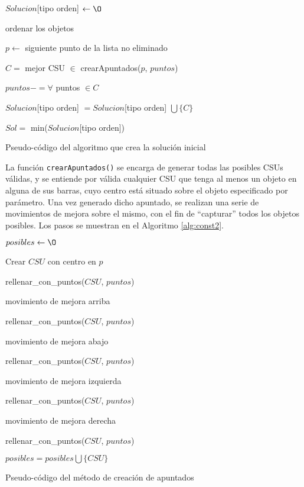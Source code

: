 \begin{algorithm}[H]
$Solucion$[tipo orden] $\leftarrow \O$

 {

  ordenar los objetos

   {

    	$p \leftarrow$ siguiente punto de la lista no eliminado

			$C =$ mejor CSU $\in$ crearApuntados($p$, $puntos$)

			$puntos -= \forall$ puntos $\in C$

			$Solucion$[tipo orden] $ = Solucion$[tipo orden] $ \bigcup\{C\}$
			
	}

}

$Sol =$ min($Solucion$[tipo orden])
\caption{Pseudo-código del algoritmo que crea la solución inicial}
\label{alg:const1}
\end{algorithm}

La función \texttt{crearApuntados()} se encarga de generar todas las posibles
CSUs válidas, y se entiende por válida cualquier CSU que tenga al menos un
objeto en alguna de sus barras, cuyo centro está situado sobre el objeto
especificado por parámetro. Una vez generado dicho apuntado, se realizan una
serie de movimientos de mejora sobre el mismo, con el fin de ``capturar'' todos
los objetos posibles. 
Los pasos se muestran en el Algoritmo \ref{alg:const2}. 

\begin{algorithm}[H]
$posibles \leftarrow \O$

 {

    Crear $CSU$ con centro en $p$ 

    rellenar\_con\_puntos($CSU$, $puntos$)

     {

        movimiento de mejora arriba

        rellenar\_con\_puntos($CSU$, $puntos$)

        movimiento de mejora abajo

        rellenar\_con\_puntos($CSU$, $puntos$)

        movimiento de mejora izquierda

        rellenar\_con\_puntos($CSU$, $puntos$)

        movimiento de mejora derecha

        rellenar\_con\_puntos($CSU$, $puntos$)

    }

    $posibles = posibles \bigcup\{CSU\}$

}
\caption{Pseudo-código del método de creación de apuntados}
\label{alg:const2}
\end{algorithm}

